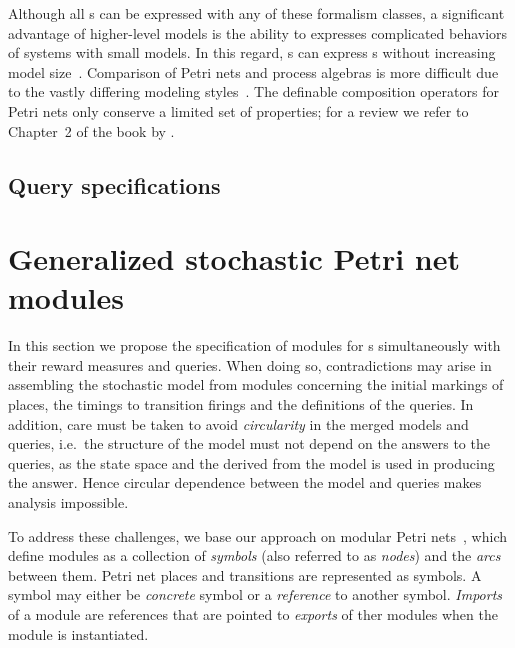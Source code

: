 \newpara Although all s can be expressed with any of these formalism classes, a significant advantage of higher-level models is the ability to expresses complicated behaviors of systems with small models. In this regard, s can express s without increasing model size~\citep{Vernon86comparison}. Comparison of Petri nets and process algebras is more difficult due to the vastly differing modeling styles~\citep{Donatelli95comparison}. The definable composition operators for Petri nets only conserve a limited set of properties; for a review we refer to Chapter~2 of the book by \citet{Hejiao12pppnpa}.


\subsection{Query specifications}


\section{Generalized stochastic Petri net modules}

In this section we propose the specification of modules for s simultaneously with their reward measures and queries. When doing so, contradictions may arise in assembling the stochastic model from modules concerning the initial markings of places, the timings to transition firings and the definitions of the queries. In addition, care must be taken to avoid \emph{circularity} in the merged models and queries, i.e.~the structure of the model must not depend on the answers to the queries, as the state space and the  derived from the model is used in producing the answer. Hence circular dependence between the model and queries makes analysis impossible.

To address these challenges, we base our approach on modular Petri nets~\citep{Kindler01modular}, which define modules as a collection of \emph{symbols} (also referred to as \emph{nodes}) and the \emph{arcs} between them. Petri net places and transitions are represented as symbols. A symbol may either be \emph{concrete} symbol or a \emph{reference} to another symbol. \emph{Imports} of a module are references that are pointed to \emph{exports} of ther modules when the module is instantiated.

